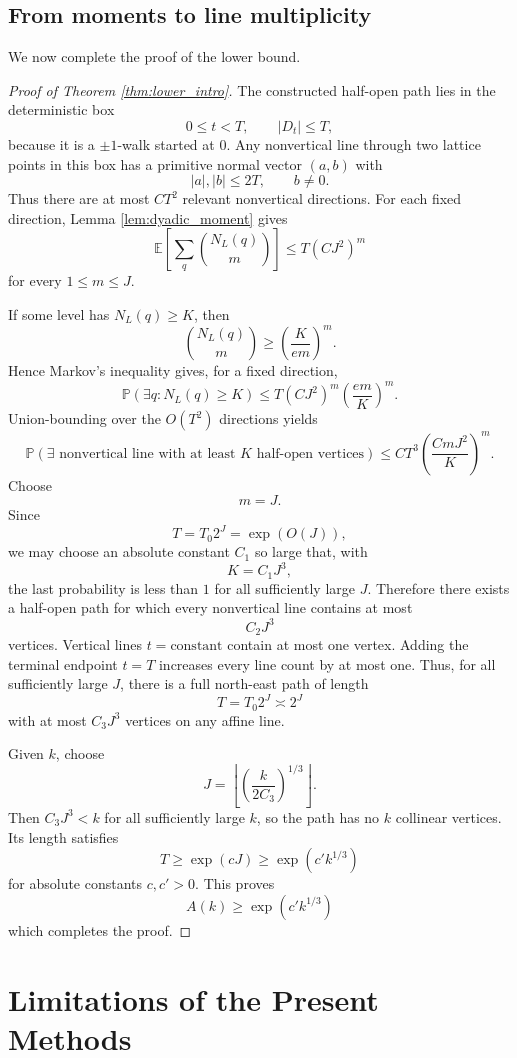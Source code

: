 \documentclass[11pt]{article}
\theoremstyle{definition}
\theoremstyle{remark}
\newcommand{\E}{\mathbb E}
\newcommand{\Pp}{\mathbb P}
\newcommand{\1}{\mathbf 1}
\begin{document}
\subsection{From moments to line multiplicity}

We now complete the proof of the lower bound.

\begin{proof}[Proof of Theorem \ref{thm:lower_intro}]
The constructed half-open path lies in the deterministic box
\[
0\le t<T,
\qquad |D_t|\le T,
\]
because it is a $\pm1$-walk started at $0$.  Any nonvertical line through two lattice points in this box has a primitive normal vector $(a,b)$ with
\[
|a|,|b|\le 2T,
\qquad b\ne0.
\]
Thus there are at most $CT^2$ relevant nonvertical directions.  For each fixed direction, Lemma \ref{lem:dyadic_moment} gives
\[
\E\left[\sum_q\binom{N_L(q)}{m}\right] \le T(CJ^2)^m
\]
for every $1\le m\le J$.

\bigskip
\noindent
If some level has $N_L(q)\ge K$, then
\[
\binom{N_L(q)}{m}\ge \left(\frac{K}{em}\right)^m.
\]
Hence Markov's inequality gives, for a fixed direction,
\[
\Pp(\exists q:N_L(q)\ge K)
\le
T(CJ^2)^m\left(\frac{em}{K}\right)^m.
\]
Union-bounding over the $O(T^2)$ directions yields
\[
\Pp(\exists\text{ nonvertical line with at least }K
\text{ half-open vertices})
\le
CT^3\left(\frac{CmJ^2}{K}\right)^m.
\]
Choose
\[
m=J.
\]
Since
\[
T=T_0 2^J=\exp(O(J)),
\]
we may choose an absolute constant $C_1$ so large that, with
\[
K=C_1J^3,
\]
the last probability is less than $1$ for all sufficiently large $J$. Therefore there exists a half-open path for which every nonvertical line
contains at most
\[
C_2J^3
\]
vertices.  Vertical lines $t=\text{constant}$ contain at most one vertex. Adding the terminal endpoint $t=T$ increases every line count by at most one.  Thus, for all sufficiently large $J$, there is a full north-east path of length
\[
T=T_0 2^J\asymp 2^J
\]
with at most $C_3J^3$ vertices on any affine line.

\bigskip
\noindent
Given $k$, choose
\[
J=\left\lfloor \left(\frac{k}{2C_3}\right)^{1/3}\right\rfloor.
\]
Then $C_3J^3<k$ for all sufficiently large $k$, so the path has no $k$ collinear vertices.  Its length satisfies
\[
T\ge \exp(cJ)\ge \exp(c'k^{1/3})
\]
for absolute constants $c,c'>0$.  This proves
\[
A(k)\ge \exp(c'k^{1/3})
\]
which completes the proof.
\end{proof}

\section{Limitations of the Present Methods}\label{sec:limitations}
\end{document}
